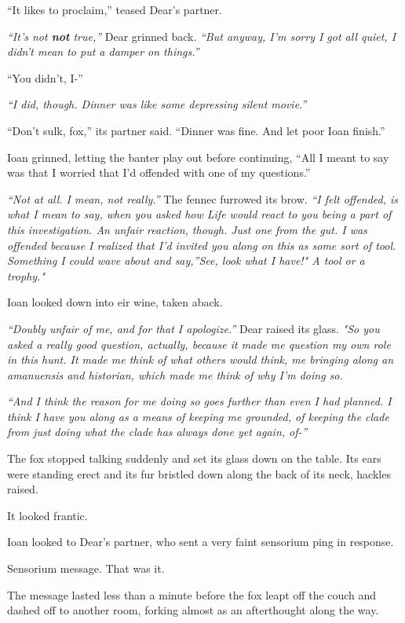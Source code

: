 ``It likes to proclaim,'' teased Dear's partner.

\emph{``It's not \textbf{not} true,''} Dear grinned back. \emph{``But anyway, I'm sorry I got all quiet, I didn't mean to put a damper on things.''}

``You didn't, I-''

\emph{``I did, though. Dinner was like some depressing silent movie.''}

``Don't sulk, fox,'' its partner said. ``Dinner was fine. And let poor Ioan finish.''

Ioan grinned, letting the banter play out before continuing, ``All I meant to say was that I worried that I'd offended with one of my questions.''

\emph{``Not at all. I mean, not really.''} The fennec furrowed its brow. \emph{``I felt offended, is what I mean to say, when you asked how Life would react to you being a part of this investigation. An unfair reaction, though. Just one from the gut. I was offended because I realized that I'd invited you along on this as some sort of tool. Something I could wave about and say,''See, look what I have!" A tool or a trophy."}

Ioan looked down into eir wine, taken aback.

\emph{``Doubly unfair of me, and for that I apologize.''} Dear raised its glass. \emph{"So you asked a really good question, actually, because it made me question my own role in this hunt. It made me think of what others would think, me bringing along an amanuensis and historian, which made me think of why I'm doing so.}

\emph{``And I think the reason for me doing so goes further than even I had planned. I think I have you along as a means of keeping me grounded, of keeping the clade from just doing what the clade has always done yet again, of-''}

The fox stopped talking suddenly and set its glass down on the table. Its ears were standing erect and its fur bristled down along the back of its neck, hackles raised.

It looked frantic.

Ioan looked to Dear's partner, who sent a very faint sensorium ping in response.

Sensorium message. That was it.

The message lasted less than a minute before the fox leapt off the couch and dashed off to another room, forking almost as an afterthought along the way.

